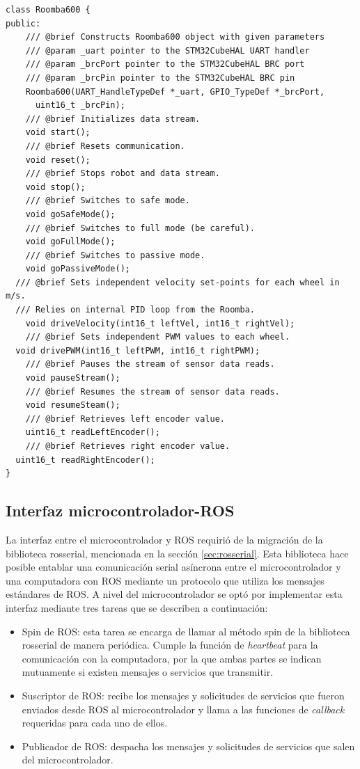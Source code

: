 \begin{lstlisting}[label=cod:Roomba600,caption=Interfaz de la clase Roomba600 que implementa el protocolo Open Interface\protect\footnotemark.]
class Roomba600 {
public:
	/// @brief Constructs Roomba600 object with given parameters
	/// @param _uart pointer to the STM32CubeHAL UART handler
	/// @param _brcPort pointer to the STM32CubeHAL BRC port
	/// @param _brcPin pointer to the STM32CubeHAL BRC pin
	Roomba600(UART_HandleTypeDef *_uart, GPIO_TypeDef *_brcPort,
      uint16_t _brcPin);
	/// @brief Initializes data stream.
	void start();
	/// @brief Resets communication.
	void reset();
	/// @brief Stops robot and data stream.
	void stop();
	/// @brief Switches to safe mode.
	void goSafeMode();
	/// @brief Switches to full mode (be careful).
	void goFullMode();
	/// @brief Switches to passive mode.
	void goPassiveMode();
  /// @brief Sets independent velocity set-points for each wheel in m/s.
  /// Relies on internal PID loop from the Roomba.
	void driveVelocity(int16_t leftVel, int16_t rightVel);
	/// @brief Sets independent PWM values to each wheel.
  void drivePWM(int16_t leftPWM, int16_t rightPWM);
	/// @brief Pauses the stream of sensor data reads.
	void pauseStream();
	/// @brief Resumes the stream of sensor data reads.
	void resumeSteam();
	/// @brief Retrieves left encoder value.
	uint16_t readLeftEncoder();
	/// @brief Retrieves right encoder value.
  uint16_t readRightEncoder();
}
\end{lstlisting}


\subsection{Interfaz microcontrolador-ROS}

La interfaz entre el microcontrolador y ROS requirió de la migración de la biblioteca rosserial, mencionada en la sección \ref{sec:rosserial}. Esta biblioteca hace posible entablar una comunicación serial asíncrona entre el microcontrolador y una computadora con ROS mediante un protocolo que utiliza los mensajes estándares de ROS. A nivel del microcontrolador se optó por implementar esta interfaz mediante tres tareas que se describen a continuación:

\begin{itemize}
  \item Spin de ROS: esta tarea se encarga de llamar al método spin de la biblioteca rosserial de manera periódica. Cumple la función de \textit{heartbeat} para la comunicación con la computadora, por la que ambas partes se indican mutuamente si existen mensajes o servicios que transmitir.
  \item Suscriptor de ROS: recibe los mensajes y solicitudes de servicios que fueron enviados desde ROS al microcontrolador y llama a las funciones de \textit{callback} requeridas para cada uno de ellos.
  \item Publicador de ROS: despacha los mensajes y solicitudes de servicios que salen del microcontrolador.
\end{itemize}

